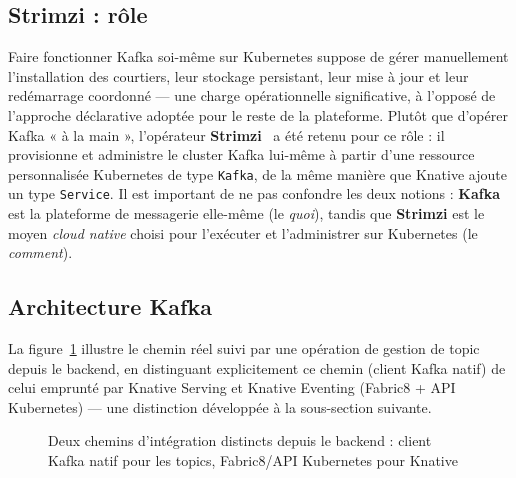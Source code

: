 \subsection{Strimzi : rôle}

Faire fonctionner Kafka soi-même sur Kubernetes suppose de gérer manuellement l'installation des courtiers, leur stockage persistant, leur mise à jour et leur redémarrage coordonné — une charge opérationnelle significative, à l'opposé de l'approche déclarative adoptée pour le reste de la plateforme. Plutôt que d'opérer Kafka « à la main », l'opérateur \textbf{Strimzi}~\citep{StrimziDoc} a été retenu pour ce rôle : il provisionne et administre le cluster Kafka lui-même à partir d'une ressource personnalisée Kubernetes de type \texttt{Kafka}, de la même manière que Knative ajoute un type \texttt{Service}. Il est important de ne pas confondre les deux notions : \textbf{Kafka} est la plateforme de messagerie elle-même (le \textit{quoi}), tandis que \textbf{Strimzi} est le moyen \textit{cloud native} choisi pour l'exécuter et l'administrer sur Kubernetes (le \textit{comment}).

\subsection{Architecture Kafka}

La figure~\ref{fig:sprint2-flux} illustre le chemin réel suivi par une opération de gestion de topic depuis le backend, en distinguant explicitement ce chemin (client Kafka natif) de celui emprunté par Knative Serving et Knative Eventing (Fabric8 + API Kubernetes) — une distinction développée à la sous-section suivante.

\begin{figure}[H]
\centering
{}
\caption{Deux chemins d'intégration distincts depuis le backend : client Kafka natif pour les topics, Fabric8/API Kubernetes pour Knative}
\label{fig:sprint2-flux}
\end{figure}

